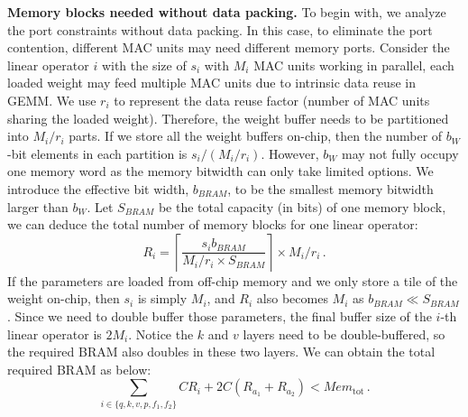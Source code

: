\textbf{Memory blocks needed without data packing.}
To begin with, we analyze the port constraints without data packing.
In this case, to eliminate the port contention, different MAC units may need different memory ports.
Consider the linear operator $i$ with the size of $s_i$ with $M_i$ MAC units working in parallel, each loaded weight may feed multiple MAC units due to intrinsic data reuse in GEMM. 
We use $r_i$ to represent the data reuse factor (number of MAC units sharing the loaded weight).
Therefore, the weight buffer needs to be partitioned into $M_i/r_i$ parts.
If we store all the weight buffers on-chip, then the number of $b_{W}$-bit elements in each partition is $s_i/(M_i/r_i)$.
However, $b_W$ may not fully occupy one memory word as the memory bitwidth can only take limited options. 
We introduce the effective bit width, $b_{BRAM}$, to be the smallest memory bitwidth larger than $b_W$.
Let $S_{BRAM}$ be the total capacity (in bits) of one memory block,
we can deduce the total number of memory blocks for one linear operator:
\begin{equation}
    R_i=\left\lceil \frac{s_ib_{BRAM}}{M_i/r_i \times S_{BRAM}} \right\rceil \times M_i/r_i\,.
\end{equation}
If the parameters are loaded from off-chip memory and we only store a tile of the weight on-chip, then $s_i$ is simply $M_i$, and $R_i$ also becomes $M_i$ as $b_{BRAM}\ll S_{BRAM}$.
Since we need to double buffer those parameters, the final buffer size of the $i$-th linear operator is $2M_i$.
Notice the $k$ and $v$ layers need to be double-buffered, so the required BRAM also doubles in these two layers.
We can obtain the total required BRAM as below:
\begin{equation}
\label{eq:port_constraint}
\sum_{i\in\{q,k,v,p,f_1,f_2\}}CR_i + 2C(R_{a_1} + R_{a_2}) < Mem_{\text{tot}}\,.
\end{equation}


